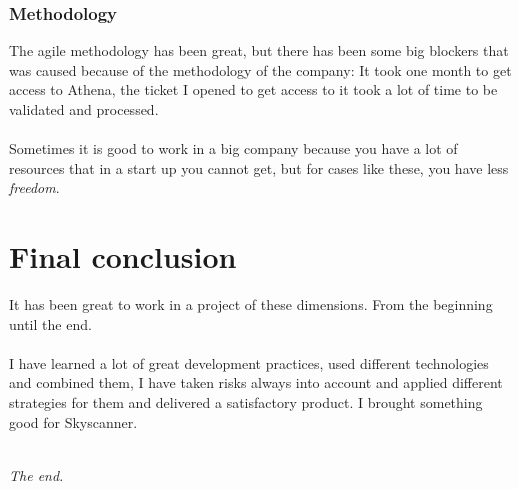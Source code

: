 \subsubsection*{Methodology}

The agile methodology has been great, but there has been some big blockers that was caused because of the methodology of the company: It took one month to get access to Athena, the ticket I opened to get access to it took a lot of time to be validated and processed.
\\\\
Sometimes it is good to work in a big company because you have a lot of resources that in a start up you cannot get, but for cases like these, you have less \textit{freedom}.

\section{Final conclusion}

It has been great to work in a project of these dimensions. From the beginning until the end.
\\\\
I have learned a lot of great development practices, used different technologies and combined them, I have taken risks always into account and applied different strategies for them and delivered a satisfactory product. I brought something good for Skyscanner.
\\\\
\begin{center}
\textit{The end.}
\end{center}

